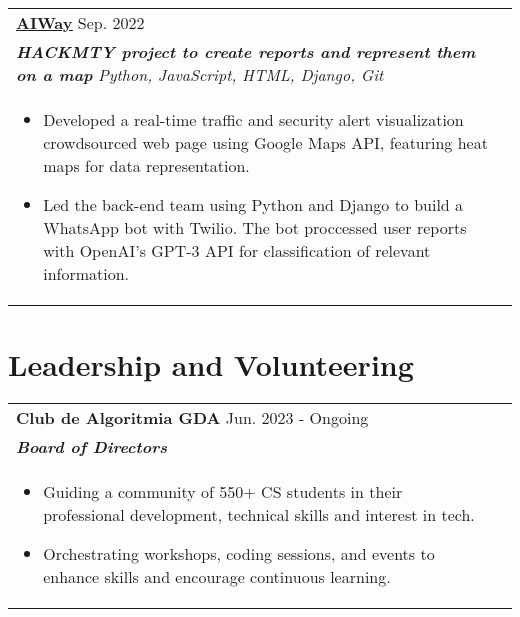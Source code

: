 \documentclass[a4paper,8pt]{article}
\begin{document}
\begin{tabularx}{\linewidth}{ @{}l r@{} }
\color[HTML]{1C033C} \textbf{\uline{\href{https://github.com/}{AIWay}}} \hfill \color[HTML]{371e77} Sep. 2022 \\[4pt]
\color[HTML]{371e77}\textbf{\textit{HACKMTY project to create reports and represent them on a map}} \hfill \color[HTML]{4B28A4} \textit{Python, JavaScript, HTML, Django, Git} \\[5pt]
\begin{minipage}[t]{\linewidth}
    \begin{itemize}[nosep,after=\strut, leftmargin=2em, itemsep=2pt]
        \item Developed a real-time traffic and security alert visualization crowdsourced web page using Google Maps API, featuring heat maps for data representation.
        \item Led the back-end team using Python and Django to build a WhatsApp bot with Twilio. The bot proccessed user reports with OpenAI's GPT-3 API for classification of relevant information.
    \end{itemize}
    \end{minipage}
\end{tabularx}

\section{Leadership and Volunteering}
\begin{tabularx}{\linewidth}{ @{}l r@{} }
\color[HTML]{1C033C} \textbf{Club de Algoritmia GDA} \hfill \color[HTML]{371e77} Jun. 2023 - Ongoing \\[5pt]
\color[HTML]{371e77}\textbf{\textit{Board of Directors}} \\[5pt]
\begin{minipage}[t]{\linewidth}
    \begin{itemize}[nosep,after=\strut, leftmargin=2em, itemsep=2pt]
        \item Guiding a community of 550+ CS students in their professional development, technical skills and interest in tech.
        \item Orchestrating workshops, coding sessions, and events to enhance skills and encourage continuous learning.
    \end{itemize}
\end{minipage}
\end{tabularx}
\end{document}
